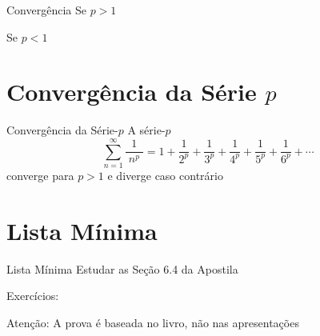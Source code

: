 \documentclass[fleqn,utf8,aspectratio=169,12pt]{beamer}
\begin{document}
\begin{resolution}{Convergência}
  Se \emph{$p>1$}

  Se \emph{$p<1$}
\end{resolution}

\section{Convergência da Série $p$}
\begin{frame}{Convergência da Série-$p$}
  A série-$p$
  \[
    \sum_{n=1}^\infty\frac{1}{\;n^p\;}
    = 1
    + \frac{1}{2^p}
    + \frac{1}{3^p}
    + \frac{1}{4^p}
    + \frac{1}{5^p}
    + \frac{1}{6^p}
    + \cdots
  \]
  converge para $p>1$ e diverge caso contrário
\end{frame}

\section{Lista Mínima}

\begin{frame}{Lista Mínima}
  Estudar as Seção 6.4 da Apostila

  \vspace{\baselineskip}
  Exercícios:

  \vfill
  Atenção: A prova é baseada no livro, não nas apresentações
\end{frame}

\end{document}
